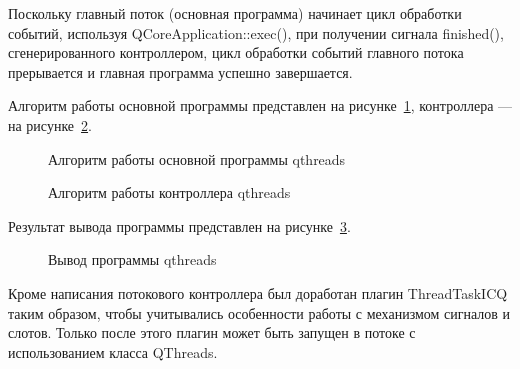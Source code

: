 Поскольку главный поток (основная программа) начинает цикл обработки событий, используя QCoreApplication::exec(), при получении сигнала finished(), сгенерированного контроллером, цикл обработки событий главного потока прерывается и главная программа успешно завершается. 

Алгоритм работы основной программы представлен на рисунке~\ref{main-qthreads:main-qthreads}, контроллера --- на рисунке~\ref{controller-qthreads:controller-qthreads}. 

\begin{figure}[h!]
\caption{ Алгоритм работы основной программы qthreads }
\label{main-qthreads:main-qthreads}
\end{figure}

\clearpage

\begin{figure}[ht]
\caption{ Алгоритм работы контроллера qthreads }
\label{controller-qthreads:controller-qthreads}
\end{figure}

\clearpage

Результат вывода программы представлен на рисунке~\ref{program-output:program-output}.

\begin{figure}[h!]
\caption{ Вывод программы qthreads }
\label{program-output:program-output}
\end{figure}

Кроме написания потокового контроллера был доработан плагин ThreadTaskICQ таким образом, чтобы учитывались особенности работы с механизмом сигналов и слотов. Только после этого плагин может быть запущен в потоке с использованием класса QThreads.  

\clearpage
